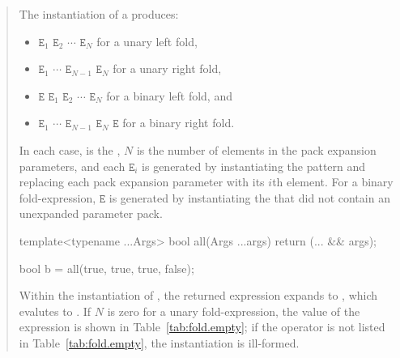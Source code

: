\begin{quote}
\begin{addedblock}
\setcounter{Paras}{8}
\pnum
The instantiation of a  produces:

\begin{itemize}
\item
\tcode{((}$\mathtt{E}_1$
            $\mathtt{E}_2$\tcode{)}
            $\cdots$\tcode{)}
            $\mathtt{E}_N$
for a unary left fold,
\item
         $\mathtt{E}_1$     
\tcode{(}$\cdots$           
\tcode{(}$\mathtt{E}_{N-1}$ 
         $\mathtt{E}_N$\tcode{))}
for a unary right fold,
\item
\tcode{(((}$\mathtt{E}$
             $\mathtt{E}_1$\tcode{)}
             $\mathtt{E}_2$\tcode{)}
             $\cdots$\tcode{)}
             $\mathtt{E}_N$
for a binary left fold, and
\item
         $\mathtt{E}_1$     
\tcode{(}$\cdots$           
\tcode{(}$\mathtt{E}_{N-1}$ 
\tcode{(}$\mathtt{E}_{N}$   
         $\mathtt{E}$\tcode{)))}
for a binary right fold.
\end{itemize}

In each case,
 is the ,
$N$ is the number of elements in the pack expansion parameters,
and each $\mathtt{E}_i$ is generated by instantiating the pattern
and replacing each pack expansion parameter with its $i$th element.
For a binary fold-expression,
$\mathtt{E}$ is generated
by instantiating the 
that did not contain an unexpanded parameter pack.
\enterexample
\begin{codeblock}
template<typename ...Args>
  bool all(Args ...args) { return (... && args); }

bool b = all(true, true, true, false);
\end{codeblock}
Within the instantiation of ,
the returned expression expands to
,
which evalutes to .
\exitexample
If $N$ is zero for a unary fold-expression,
the value of the expression is shown in Table~\ref{tab:fold.empty};
if the operator is not listed in Table~\ref{tab:fold.empty},
the instantiation is ill-formed.


\end{addedblock}
\end{quote}
